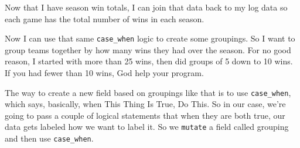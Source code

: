 \documentclass[
]{book}
\newenvironment{Shaded}{\begin{snugshade}}{\end{snugshade}}
\newcommand{\DataTypeTok}[1]{\textcolor[rgb]{0.13,0.29,0.53}{#1}}
\newcommand{\DecValTok}[1]{\textcolor[rgb]{0.00,0.00,0.81}{#1}}
\newcommand{\KeywordTok}[1]{\textcolor[rgb]{0.13,0.29,0.53}{\textbf{#1}}}
\newcommand{\NormalTok}[1]{#1}
\newcommand{\OperatorTok}[1]{\textcolor[rgb]{0.81,0.36,0.00}{\textbf{#1}}}
\newcommand{\StringTok}[1]{\textcolor[rgb]{0.31,0.60,0.02}{#1}}
\begin{document}
Now that I have season win totals, I can join that data back to my log data so each game has the total number of wins in each season.

\begin{Shaded}
\end{Shaded}

Now I can use that same \texttt{case\_when} logic to create some groupings. So I want to group teams together by how many wins they had over the season. For no good reason, I started with more than 25 wins, then did groups of 5 down to 10 wins. If you had fewer than 10 wins, God help your program.

The way to create a new field based on groupings like that is to use \texttt{case\_when}, which says, basically, when This Thing Is True, Do This. So in our case, we're going to pass a couple of logical statements that when they are both true, our data gets labeled how we want to label it. So we \texttt{mutate} a field called grouping and then use \texttt{case\_when}.

\begin{Shaded}
\end{Shaded}
\end{document}
